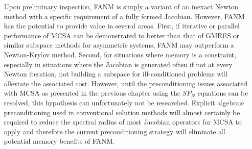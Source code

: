 Upon preliminary inspection, FANM is simply a variant of an inexact
Newton method with a specific requirement of a fully formed
Jacobian. However, FANM has the potential to provide value in several
areas. First, if iterative or parallel performance of MCSA can be
demonstrated to better than that of GMRES or similar subspace methods
for asymmetric systems, FANM may outperform a Newton-Krylov
method. Second, for situations where memory is a constraint,
especially in situations where the Jacobian is generated often if not
at every Newton iteration, not building a subspace for ill-conditioned
problems will alleviate the associated cost. However, until the
preconditioning issues associated with MCSA as presented in the
previous chapter using the $SP_N$ equations can be resolved, this
hypothesis can unfortunately not be researched. Explicit algebraic
preconditioning used in conventional solution methods will almost
certainly be required to reduce the spectral radius of most Jacobian
operators for MCSA to apply and therefore the current preconditioning
strategy will eliminate all potential memory benefits of FANM.

